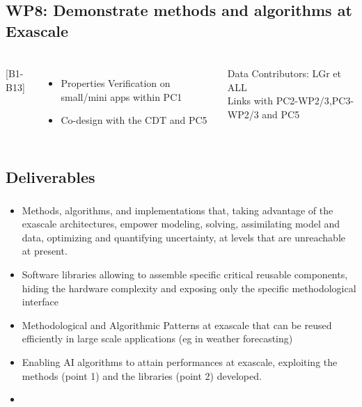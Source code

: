 \subsection{WP8: Demonstrate methods and algorithms at Exascale}
\begin{frame}
  \frametitle{\insertsectionhead}
  \framesubtitle{\insertsubsectionhead}

  \begin{columns}
    [B1-B13]
    \begin{itemize}
      \item Properties Verification on small/mini apps within PC1
      \item Co-design with the CDT and PC5
    \end{itemize}
    \begin{alertblock}{Data }
      Contributors: LGr et ALL\\
      Links with PC2-WP2/3,PC3-WP2/3 and PC5
    \end{alertblock}
   
  \end{columns}
\end{frame}

\subsection{Deliverables}

\begin{frame}
  \frametitle{\insertsectionhead}
  \framesubtitle{\insertsubsectionhead}
  \begin{itemize}
      \item   Methods, algorithms, and implementations that, taking advantage of the exascale architectures, empower modeling, solving, assimilating model and data, optimizing and quantifying uncertainty, at levels that are unreachable at present.
    \item Software libraries allowing to assemble specific critical reusable components, hiding the hardware complexity and exposing only the specific methodological interface
    \item Methodological and Algorithmic Patterns at exascale that can be reused efficiently in large scale applications (eg in weather forecasting)
    \item Enabling AI algorithms to attain performances at exascale, exploiting the methods (point 1) and the libraries (point 2) developed.
    \item \href{https://docs.google.com/document/d/1hjwSFRF63SyTUJJKGMNLHcJPr_S2JDHYXeBeQzHCSno/edit?usp=sharing}{}

  \end{itemize}


\end{frame}

